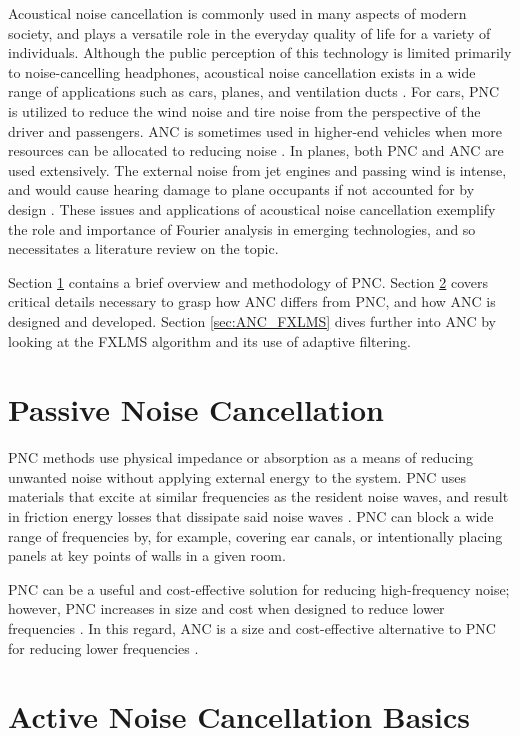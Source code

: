 \documentclass[11pt, letterpaper]{article}
\numberwithin{equation}{section}
\begin{document}
Acoustical noise cancellation is commonly used in many aspects of modern society, and plays a versatile role in the everyday quality of life for a variety of individuals. Although the public perception of this technology is limited primarily to noise-cancelling headphones, acoustical noise cancellation exists in a wide range of applications such as cars, planes, and ventilation ducts \cite{kuo}. For cars, PNC is utilized to reduce the wind noise and tire noise from the perspective of the driver and passengers. ANC is sometimes used in higher-end vehicles when more resources can be allocated to reducing noise \cite{chen}. In planes, both PNC and ANC are used extensively. The external noise from jet engines and passing wind is intense, and would cause hearing damage to plane occupants if not accounted for by design \cite{roy}. These issues and applications of acoustical noise cancellation exemplify the role and importance of Fourier analysis in emerging technologies, and so necessitates a literature review on the topic.

Section \ref{sec:PNC} contains a brief overview and methodology of PNC. Section \ref{sec:ANC_Basics} covers critical details necessary to grasp how ANC differs from PNC, and how ANC is designed and developed. Section \ref{sec:ANC_FXLMS} dives further into ANC by looking at the FXLMS algorithm and its use of adaptive filtering.

\section{Passive Noise Cancellation}
\label{sec:PNC}

PNC methods use physical impedance or absorption as a means of reducing unwanted noise without applying external energy to the system. PNC uses materials that excite at similar frequencies as the resident noise waves, and result in friction energy losses that dissipate said noise waves \cite{lu}. PNC can block a wide range of frequencies by, for example, covering ear canals, or intentionally placing panels at key points of walls in a given room.

PNC can be a useful and cost-effective solution for reducing high-frequency noise; however, PNC increases in size and cost when designed to reduce lower frequencies \cite{kuo}. In this regard, ANC is a size and cost-effective alternative to PNC for reducing lower frequencies \cite{kuo}.

\section{Active Noise Cancellation Basics}
\label{sec:ANC_Basics}
\end{document}
